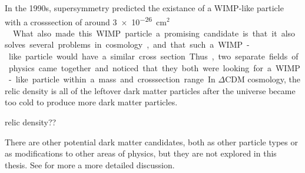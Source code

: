   In the 1990s, supersymmetry predicted the existance of a WIMP-like particle with a crosssection of around \nicetilde \SI{3e-26}{cm$^2$} \cite{Jungman:1995df}.
  What also made this WIMP particle a promising candidate is that it also solves several problems in cosmology, and that such a WIMP-like particle would have a similar cross section.
  Thus, two separate fields of physics came together and noticed that they both were looking for a WIMP-like particle within a mass and crosssection range.
  In $\Delta$CDM cosmology, the relic density is all of the leftover dark matter particles after the universe became too cold to produce more dark matter particles.

  {\color{red} relic density??}

  There are other potential dark matter candidates, both as other particle types or as modifications to other areas of physics, but they are not explored in this thesis.
  See \cite{DMPrimer} for more a more detailed discussion.



